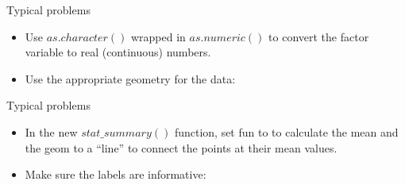 \documentclass[
  ignorenonframetext,
]{beamer}
\begin{document}
\begin{frame}{Typical problems}
\label{typical-problems-5}
\begin{itemize}
\item
  Use \(as.character()\) wrapped in \(as.numeric()\) to convert the
  factor variable to real (continuous) numbers.
\item
  Use the appropriate geometry for the data:
\end{itemize}
\end{frame}

\begin{frame}{Typical problems}
\label{typical-problems-6}
\begin{itemize}
\item
  In the new \(stat\_summary()\) function, set fun to to calculate the
  mean and the geom to a ``line'' to connect the points at their mean
  values.
\item
  Make sure the labels are informative:
\end{itemize}
\end{frame}
\end{document}
